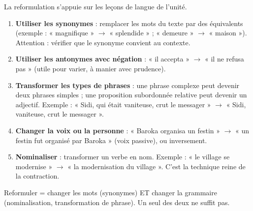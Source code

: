 \documentclass[11pt]{article}
\begin{document}
\begin{methode}
La reformulation s'appuie sur les leçons de langue de l'unité.
\begin{enumerate}
\item \textbf{Utiliser les synonymes} : remplacer les mots du texte par des équivalents (exemple : « magnifique » $\rightarrow$ « splendide » ; « demeure » $\rightarrow$ « maison »). Attention : vérifier que le synonyme convient au contexte.
\item \textbf{Utiliser les antonymes avec négation} : « il accepta » $\rightarrow$ « il ne refusa pas » (utile pour varier, à manier avec prudence).
\item \textbf{Transformer les types de phrases} : une phrase complexe peut devenir deux phrases simples ; une proposition subordonnée relative peut devenir un adjectif. Exemple : « Sidi, qui était vaniteuse, crut le messager » $\rightarrow$ « Sidi, vaniteuse, crut le messager ».
\item \textbf{Changer la voix ou la personne} : « Baroka organisa un festin » $\rightarrow$ « un festin fut organisé par Baroka » (voix passive), ou inversement.
\item \textbf{Nominaliser} : transformer un verbe en nom. Exemple : « le village se modernise » $\rightarrow$ « la modernisation du village ». C'est la technique reine de la contraction.
\end{enumerate}
\end{methode}

\begin{aretenir}[Réflexe]
Reformuler = changer les mots (synonymes) ET changer la grammaire (nominalisation, transformation de phrase). Un seul des deux ne suffit pas.
\end{aretenir}
\end{document}
